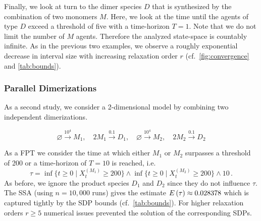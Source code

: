 
Finally, we look at turn to the dimer species $D$ that is synthesized by the combination of
two monomers $M$. Here, we look at the time until the agents of type $D$ exceed a threshold of five
with a time-horizon $T=1$. Note that we do not limit the number of $M$ agents. Therefore
the analyzed state-space is countably infinite. As in the previous two examples, we
observe a roughly exponential decrease in interval size with increasing relaxation
order $r$ (cf.\ \autoref{fig:convergence} and \autoref{tab:bounds}).


\subsubsection{Parallel Dimerizations}
As a second study, we consider a 2-dimensional model by combining two
independent dimerizations.
\begin{model}\label{model:double_dim}
$$\varnothing\xrightarrow{10^4}M_1,\quad 2M_1\xrightarrow{0.1}D_1,\quad \varnothing\xrightarrow{10^4}M_2,\quad 2M_2\xrightarrow{0.1}D_2$$
\end{model}
As a \ac{FPT} we consider the time at which either $M_1$ or $M_2$ surpasses a threshold of 200 or a time-horizon of $T=10$
is reached, i.e.
$$ \tau=\inf\{t\geq 0\mid X_t^{(M_1)} \geq 200\}\land \inf\{t\geq 0\mid X_t^{(M_2)} \geq 200\}\land 10\,.$$
As before, we ignore the product species $D_1$ and $D_2$ since they do not influence $\tau$.
The \ac{SSA}   (using $n=10,\!000$ runs) gives the estimate ${E}\left(\tau\right)\approx 0.028378$ %
which is captured tightly by the \ac{SDP} bounds (cf.\ \autoref{tab:bounds}).
For higher relaxation orders $r \geq 5$  numerical issues prevented the solution of the
corresponding \acp{SDP}.


